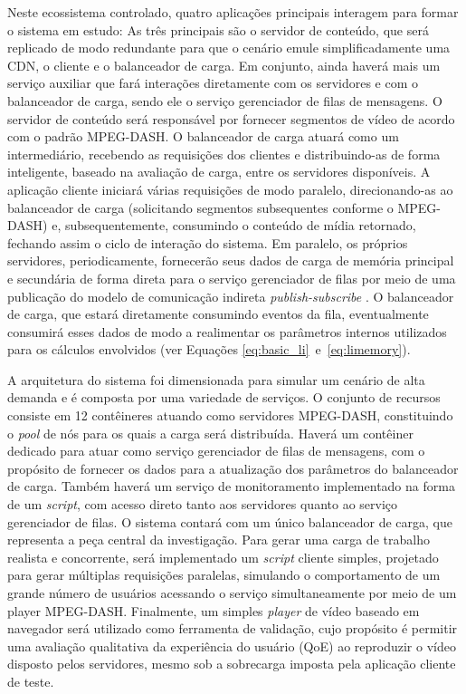 Neste ecossistema controlado, quatro aplicações principais interagem para formar o sistema em estudo: As três principais são o servidor de conteúdo, que será replicado de modo redundante para que o cenário emule simplificadamente uma CDN, o cliente e o balanceador de carga. Em conjunto, ainda haverá mais um serviço auxiliar que fará interações diretamente com os servidores e com o balanceador de carga, sendo ele o serviço gerenciador de filas de mensagens. O servidor de conteúdo será responsável por fornecer segmentos de vídeo de acordo com o padrão MPEG-DASH. O balanceador de carga atuará como um intermediário, recebendo as requisições dos clientes e distribuindo-as de forma inteligente, baseado na avaliação de carga, entre os servidores disponíveis. A aplicação cliente iniciará várias requisições de modo paralelo, direcionando-as ao balanceador de carga (solicitando segmentos subsequentes conforme o MPEG-DASH) e, subsequentemente, consumindo o conteúdo de mídia retornado, fechando assim o ciclo de interação do sistema. Em paralelo, os próprios servidores, periodicamente, fornecerão seus dados de carga de memória principal e secundária de forma direta para o serviço gerenciador de filas por meio de uma publicação do modelo de comunicação indireta \textit{publish-subscribe} \cite{eugster2003many}. O balanceador de carga, que estará diretamente consumindo eventos da fila, eventualmente consumirá esses dados de modo a realimentar os parâmetros internos utilizados para os cálculos envolvidos (ver Equações \mbox{\ref{eq:basic_li} e \ref{eq:limemory}}).

A arquitetura do sistema foi dimensionada para simular um cenário de alta demanda e é composta por uma variedade de serviços. O conjunto de recursos consiste em 12 contêineres atuando como servidores MPEG-DASH, constituindo o \textit{pool} de nós para os quais a carga será distribuída. Haverá um contêiner dedicado para atuar como serviço gerenciador de filas de mensagens, com o propósito de fornecer os dados para a atualização dos parâmetros do balanceador de carga. Também haverá um serviço de monitoramento implementado na forma de um \textit{script}, com acesso direto tanto aos servidores quanto ao serviço gerenciador de filas. O sistema contará com um único balanceador de carga, que representa a peça central da investigação. Para gerar uma carga de trabalho realista e concorrente, será implementado um \textit{script} cliente simples, projetado para gerar múltiplas requisições paralelas, simulando o comportamento de um grande número de usuários acessando o serviço simultaneamente por meio de um player MPEG-DASH. Finalmente, um simples \textit{player} de vídeo baseado em navegador será utilizado como ferramenta de validação, cujo propósito é permitir uma avaliação qualitativa da experiência do usuário (QoE) ao reproduzir o vídeo disposto pelos servidores, mesmo sob a sobrecarga imposta pela aplicação cliente de teste.

